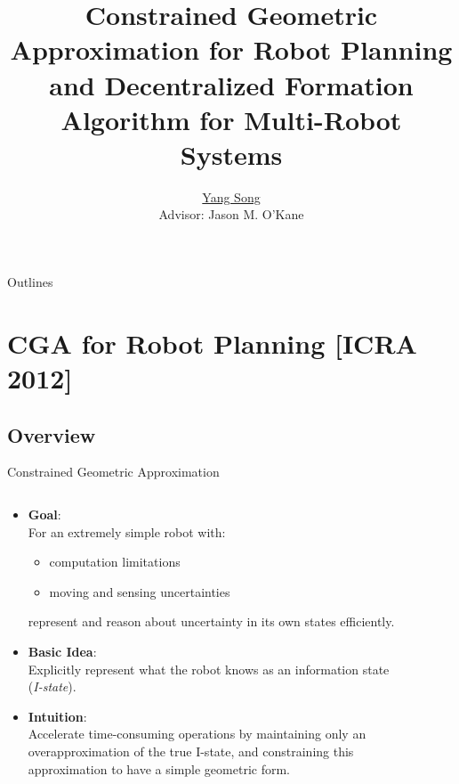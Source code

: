 \documentclass[10pt]{beamer}
\title[Ph.D. Defense]{Constrained Geometric Approximation for Robot Planning and  Decentralized Formation Algorithm for Multi-Robot Systems}
\author[Yang Song]{
  \underline{Yang Song}\\
  Advisor: Jason M. O'Kane
}
\institute[
USC
] %
{ %
  Dept. of Computer Science and Engineering\\
  University of South Carolina
  
}
\begin{document}
\begin{frame}
  \titlepage
\end{frame}
\begin{frame}{Outlines}{}
\tableofcontents
\end{frame}

\section{CGA for Robot Planning [ICRA 2012]}
\subsection[Overview]{Overview}
\begin{frame}{Constrained Geometric Approximation}
\begin{columns}
  \begin{column}{.65\textwidth}
    \begin{itemize}
    \item \textbf{Goal}:\\
    For an extremely simple robot with:
    \begin{itemize}
    \item computation limitations
    \item moving and sensing uncertainties
    \end{itemize}
    represent and reason about uncertainty in its own states efficiently.\\
    \item \textbf{Basic Idea}:\\
    Explicitly represent what the robot knows as an information state (\textit{I-state}).
    \item \textbf{Intuition}:\\
    Accelerate time-consuming operations by maintaining only an \textcolor[rgb]{1.00,0.00,0.00}{overapproximation} of the true
    I-state, and constraining this approximation
    to have a simple geometric form.\\
    \end{itemize}
  \end{column}
  \begin{column}{.35\textwidth}
    \begin{figure}

\end{figure}
\end{column}
\end{columns}
\end{frame}
\end{document}
